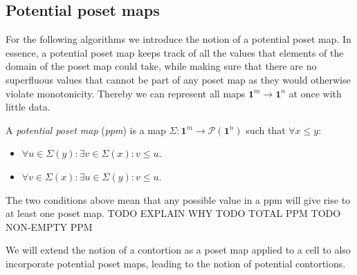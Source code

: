 \documentclass{llncs}
\newcommand{\mname}[1]{\textit{{#1}}}
\newcommand{\pint}[1]{\mathbf{1}^{#1}}
\newcommand{\pintrestr}[3]{\mathbf{1}^{#1}_{{#2}={#3}}}
\newcommand{\restrict}[2]{{#1}|_{#2}}
\newcommand{\dmap}[2]{d^{({#1} , {#2})}}
\newcommand{\pow}[1]{\mathcal{P}({#1})}
\begin{document}


\subsection{Potential poset maps}
\label{ssec:ppm}

For the following algorithms we introduce the notion of a potential poset map. In
essence, a potential poset map keeps track of all the values that elements of
the domain of the poset map could take, while making sure that there are no
superfluous values that cannot be part of any poset map as they would otherwise
violate monotonicity. Thereby we can represent all maps $\pint{m} \to \pint{n}$
at once with little data.

\begin{definition}\label{def:ppm}

  A \mname{potential poset map} (\mname{ppm}) is a map $\Sigma : \pint{m} \to \pow{\pint{n}}$
  such that $\forall x \leq y$:
  \begin{itemize}
  \item $\forall u \in \Sigma(y) : \exists v \in \Sigma(x) : v \leq u$.
  \item $\forall v \in \Sigma(x) : \exists u \in \Sigma(y) : v \leq u$.
  \end{itemize}

\end{definition}

The two conditions above mean that any possible value in a ppm will give
rise to at least one poset map. TODO EXPLAIN WHY TODO TOTAL PPM TODO NON-EMPTY PPM


We will extend the notion of a contortion as a poset map applied to a cell to
also incorporate potential poset maps, leading to the notion of potential contortions.
\end{document}
